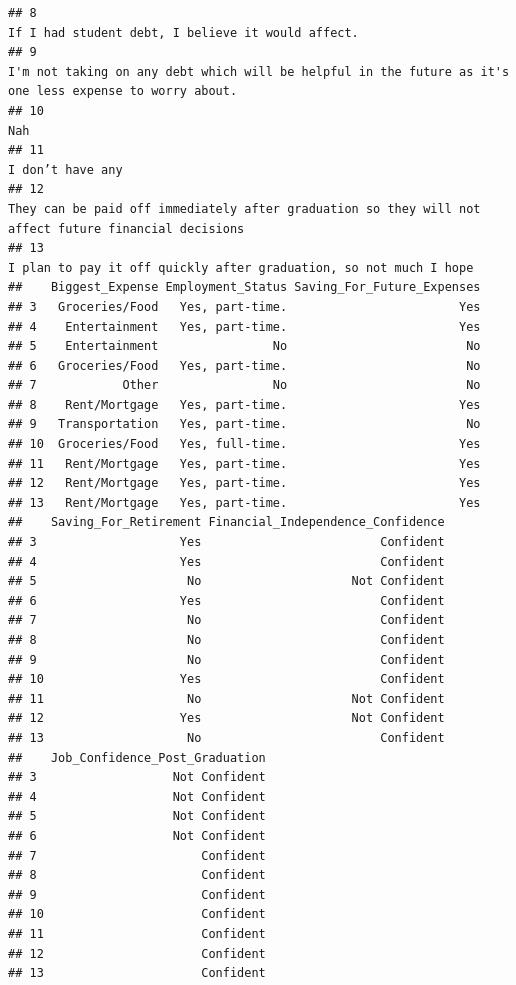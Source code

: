 \documentclass[
]{article}
\begin{document}
\begin{verbatim}
## 8                                                                                                                          If I had student debt, I believe it would affect. 
## 9                                                                     I'm not taking on any debt which will be helpful in the future as it's one less expense to worry about.
## 10                                                                                                                                                                        Nah
## 11                                                                                                                                                          I don’t have any 
## 12                                                                       They can be paid off immediately after graduation so they will not affect future financial decisions
## 13                                                                                                          I plan to pay it off quickly after graduation, so not much I hope
##    Biggest_Expense Employment_Status Saving_For_Future_Expenses
## 3   Groceries/Food   Yes, part-time.                        Yes
## 4    Entertainment   Yes, part-time.                        Yes
## 5    Entertainment                No                         No
## 6   Groceries/Food   Yes, part-time.                         No
## 7            Other                No                         No
## 8    Rent/Mortgage   Yes, part-time.                        Yes
## 9   Transportation   Yes, part-time.                         No
## 10  Groceries/Food   Yes, full-time.                        Yes
## 11   Rent/Mortgage   Yes, part-time.                        Yes
## 12   Rent/Mortgage   Yes, part-time.                        Yes
## 13   Rent/Mortgage   Yes, part-time.                        Yes
##    Saving_For_Retirement Financial_Independence_Confidence
## 3                    Yes                         Confident
## 4                    Yes                         Confident
## 5                     No                     Not Confident
## 6                    Yes                         Confident
## 7                     No                         Confident
## 8                     No                         Confident
## 9                     No                         Confident
## 10                   Yes                         Confident
## 11                    No                     Not Confident
## 12                   Yes                     Not Confident
## 13                    No                         Confident
##    Job_Confidence_Post_Graduation
## 3                   Not Confident
## 4                   Not Confident
## 5                   Not Confident
## 6                   Not Confident
## 7                       Confident
## 8                       Confident
## 9                       Confident
## 10                      Confident
## 11                      Confident
## 12                      Confident
## 13                      Confident
\end{verbatim}
\end{document}
